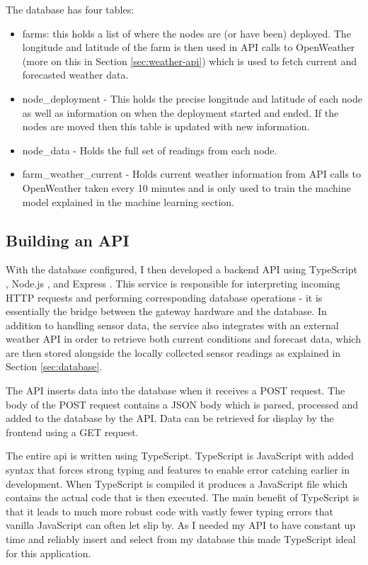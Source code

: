 The database has four tables:

\begin{itemize}
    \item farms: this holds a list of where the nodes are (or have been)
          deployed. The longitude and latitude of the farm is then used in API
          calls to OpenWeather (more on this in Section \ref{sec:weather-api})
          which is used to fetch current and forecasted weather data.
    \item node\_deployment - This holds the precise longitude and latitude of
          each node as well as information on when the deployment started and
          ended. If the nodes are moved then this table is updated with new
          information.
    \item node\_data - Holds the full set of readings from each node.
    \item farm\_weather\_current - Holds current weather information from API
          calls to OpenWeather taken every 10 minutes and is only used to train
          the machine model explained in the machine learning section.
\end{itemize}


\subsection{Building an API}\label{sec:building-api}

With the database configured, I then developed a backend API using TypeScript
\cite{typescript}, Node.js \cite{nodejs}, and Express \cite{express}. This
service is responsible for interpreting incoming HTTP requests and performing
corresponding database operations - it is essentially the bridge between the
gateway hardware and the database. In addition to handling sensor data, the
service also integrates with an external weather API in order to retrieve both
current conditions and forecast data, which are then stored alongside the
locally collected sensor readings as explained in Section \ref{sec:database}.

The API inserts data into the database when it receives a POST request. The body
of the POST request contains a JSON body which is parsed, processed and added to
the database by the API. Data can be retrieved for display by the frontend using
a GET request.

The entire api is written using TypeScript. TypeScript is JavaScript with added
syntax that forces strong typing and features to enable error catching earlier
in development. When TypeScript is compiled it produces a JavaScript file which
contains the actual code that is then executed. The main benefit of TypeScript
is that it leads to much more robust code with vastly fewer typing errors that
vanilla JavaScript can often let slip by. As I needed my API to have constant up
time and reliably insert and select from my database this made TypeScript ideal
for this application.

